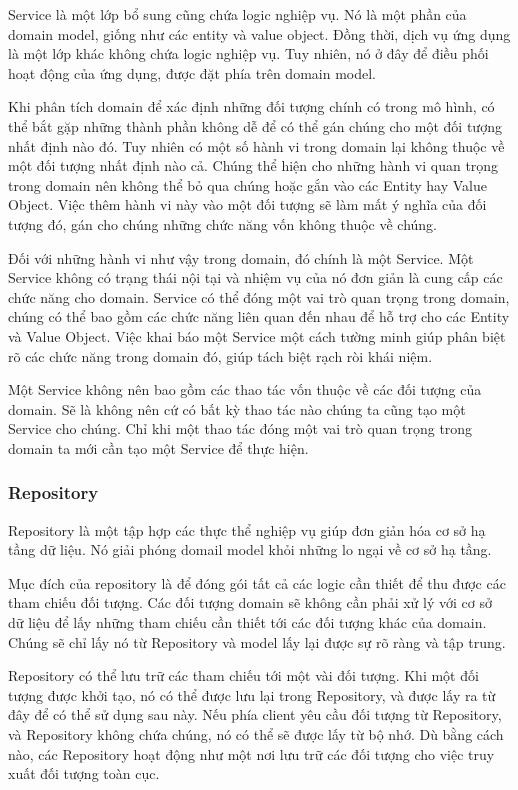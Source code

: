 Service là một lớp bổ sung cũng chứa logic nghiệp vụ. Nó là một phần của domain model, giống như các entity và value object. Đồng thời, dịch vụ ứng dụng là một lớp khác không chứa logic nghiệp vụ. Tuy nhiên, nó ở đây để điều phối hoạt động của ứng dụng, được đặt phía trên domain model.

Khi phân tích domain để xác định những đối tượng chính có trong mô hình, có thể bắt gặp những thành phần không dễ để có thể gán chúng cho một đối tượng nhất định nào đó. Tuy nhiên có một số hành vi trong domain lại không thuộc về một đối tượng nhất định nào cả. Chúng thể hiện cho những hành vi quan trọng trong domain nên không thể bỏ qua chúng hoặc gắn vào các Entity hay Value Object. Việc thêm hành vi này vào một đối tượng sẽ làm mất ý nghĩa của đối tượng đó, gán cho chúng những chức năng vốn không thuộc về chúng.

Đối với những hành vi như vậy trong domain, đó chính là một Service. Một Service không có trạng thái nội tại và nhiệm vụ của nó đơn giản là cung cấp các chức năng cho domain. Service có thể đóng một vai trò quan trọng trong domain, chúng có thể bao gồm các chức năng liên quan đến nhau để hỗ trợ cho các Entity và Value Object. Việc khai báo một Service một cách tường minh giúp phân biệt rõ các chức năng trong domain đó, giúp tách biệt rạch ròi khái niệm.

Một Service không nên bao gồm các thao tác vốn thuộc về các đối tượng của domain. Sẽ là không nên cứ có bất kỳ thao tác nào chúng ta cũng tạo một Service cho chúng. Chỉ khi một thao tác đóng một vai trò quan trọng trong domain ta mới cần tạo một Service để thực hiện.

\subsubsection{Repository}

Repository là một tập hợp các thực thể nghiệp vụ giúp đơn giản hóa cơ sở hạ tầng dữ liệu. Nó giải phóng domail model khỏi những lo ngại về cơ sở hạ tầng.

Mục đích của repository là để đóng gói tất cả các logic cần thiết để thu được các tham chiếu đối tượng. Các đối tượng domain sẽ không cần phải xử lý với cơ sở dữ liệu để lấy những tham chiếu cần thiết tới các đối tượng khác của domain. Chúng sẽ chỉ lấy nó từ Repository và model lấy lại được sự rõ ràng và tập trung.

Repository có thể lưu trữ các tham chiếu tới một vài đối tượng. Khi một đối tượng được khởi tạo, nó có thể được lưu lại trong Repository, và được lấy ra từ đây để có thể sử dụng sau này. Nếu phía client yêu cầu đối tượng từ Repository, và Repository không chứa chúng, nó có thể sẽ được lấy từ bộ nhớ. Dù bằng cách nào, các Repository hoạt động như một nơi lưu trữ các đối tượng cho việc truy xuất đối tượng toàn cục.

